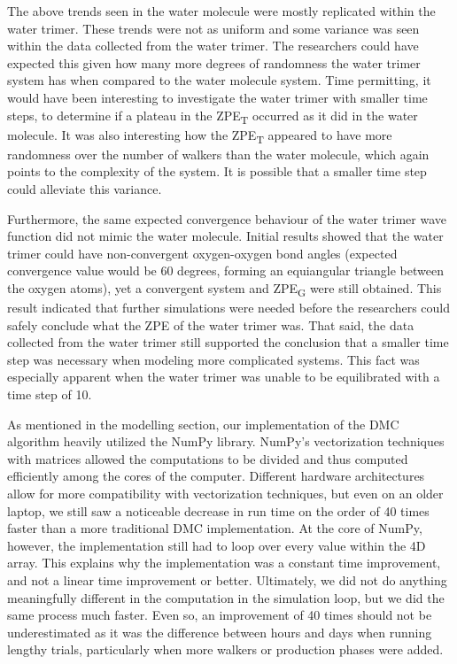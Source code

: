 \documentclass[journal=jacsat,manuscript=article]{achemso}
\begin{document}
The above trends seen in the water molecule were mostly replicated within the water trimer. These trends were not as uniform and some variance was seen within the data collected from the water trimer. The researchers could have expected this given how many more degrees of randomness the water trimer system has when compared to the water molecule system. Time permitting, it would have been interesting to investigate the water trimer with smaller time steps, to determine if a plateau in the ZPE\textsubscript{T} occurred as it did in the water molecule. It was also interesting how the ZPE\textsubscript{T} appeared to have more randomness over the number of walkers than the water molecule, which again points to the complexity of the system. It is possible that a smaller time step could alleviate this variance. 

Furthermore, the same expected convergence behaviour of the water trimer wave function did not mimic the water molecule. Initial results showed that the water trimer could have non-convergent oxygen-oxygen bond angles (expected convergence value would be 60 degrees, forming an equiangular triangle between the oxygen atoms), yet a convergent system and ZPE\textsubscript{G} were still obtained. This result indicated that further simulations were needed before the researchers could safely conclude what the ZPE of the water trimer was. That said, the data collected from the water trimer still supported the conclusion that a smaller time step was necessary when modeling more complicated systems. This fact was especially apparent when the water trimer was unable to be equilibrated with a time step of 10.

As mentioned in the modelling section, our implementation of the DMC algorithm heavily utilized the NumPy library. NumPy’s vectorization techniques with matrices allowed the computations to be divided and thus computed efficiently among the cores of the computer. Different hardware architectures allow for more compatibility with vectorization techniques, but even on an older laptop, we still saw a noticeable decrease in run time on the order of 40 times faster than a more traditional DMC implementation. At the core of NumPy, however, the implementation still had to loop over every value within the 4D array. This explains why the implementation was a constant time improvement, and not a linear time improvement or better. Ultimately, we did not do anything meaningfully different in the computation in the simulation loop, but we did the same process much faster. Even so, an improvement of 40 times should not be underestimated as it was the difference between hours and days when running lengthy trials, particularly when more walkers or production phases were added.
\end{document}
